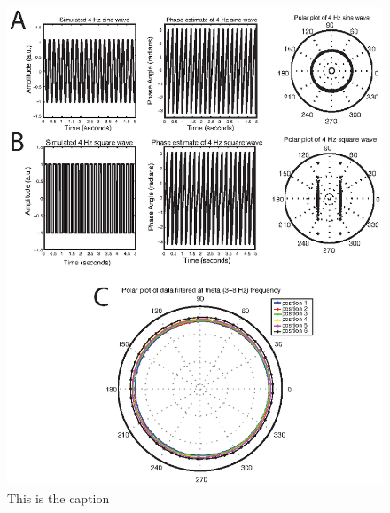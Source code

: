 \begin{figure}[htbp]
\centering
\includegraphics{figures/chapter3_suppfigure13}
\caption{This is the caption}
\end{figure}
